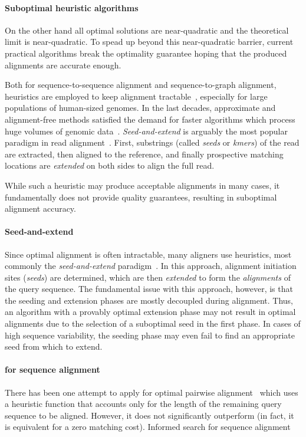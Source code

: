 \paragraph{Suboptimal heuristic algorithms}
On the other hand all optimal solutions are near-quadratic and the theoretical
limit is near-quadratic. To spead up beyond this near-quadratic barrier, current
practical algorithms break the optimality guarantee hoping that the produced
alignments are accurate enough. 

Both for sequence-to-sequence alignment and sequence-to-graph alignment,
heuristics are employed to keep alignment
tractable~\cite{altschul_basic_1990,langmead_fast_2012,garrison_variation_2018},
especially for large populations of human-sized genomes.
%
%
In the last decades, approximate and alignment-free methods satisfied the demand
for faster algorithms which process huge volumes of genomic
data~\citep{kucherov2019evolution}. 
%
\emph{Seed-and-extend} is arguably the most popular paradigm in read
alignment~\citep{altschul_basic_1990,langmead_fast_2012,li_fast_2009}. First,
substrings (called \emph{seeds} or \emph{kmers}) of the read are extracted, then
aligned to the reference, and finally prospective matching locations are
\emph{extended} on both sides to align the full read.

While such a heuristic may produce acceptable alignments in many cases, it
fundamentally does not provide quality guarantees, resulting in suboptimal
alignment accuracy.

\paragraph{Seed-and-extend}
Since optimal alignment is often intractable, many aligners use heuristics, most
commonly the \emph{seed-and-extend}
paradigm~\cite{altschul_basic_1990,langmead_fast_2012,li_fast_2009}. In this
approach, alignment initiation sites (\emph{seeds}) are determined, which are
then \emph{extended} to form the \emph{alignments} of the query sequence. The
fundamental issue with this approach, however, is that the seeding and extension
phases are mostly decoupled during alignment. Thus, an algorithm with a provably
optimal extension phase may not result in optimal alignments due to the
selection of a suboptimal seed in the first phase. In cases of high sequence
variability, the seeding phase may even fail to find an appropriate seed from
which to extend.

\paragraph{\A for sequence alignment}
There has been one attempt to apply \A for optimal pairwise
alignment~\cite{dox2018efficient} which uses a heuristic function that accounts
only for the length of the remaining query sequence to be aligned. However, it
does not significantly outperform \dijkstra (in fact, it is equivalent for a
zero matching cost).
Informed search for sequence alignment

